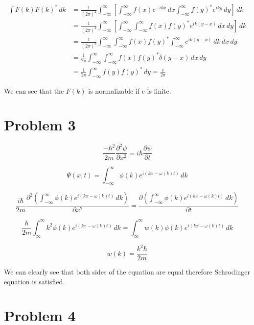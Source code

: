 \documentclass[12pt]{article}
\begin{document}
\begin{equation*}
    \begin{split}
        \int F(k) {F(k)}^*\, dk
         & = \frac{1}{(2 \pi)^2} \int_{-\infty}^{\infty} \left[\int_{-\infty}^{\infty} f(x) e^{-ikx}\, dx \int_{-\infty}^{\infty} {f(y)}^* e^{iky}\, dy \right]\, dk \\
         & = \frac{1}{(2 \pi)^2} \int_{-\infty}^{\infty} \left[\int_{-\infty}^{\infty}\int_{-\infty}^{\infty} f(x){f(y)}^* e^{ik(y-x)}\,dx\, dy \right]\, dk         \\
         & = \frac{1}{(2 \pi)^2} \int_{-\infty}^{\infty} \int_{-\infty}^{\infty} f(x){f(y)}^*\int_{-\infty}^{\infty} e^{ik(y-x)}\,dk\, dx \, dy                      \\
         & = \frac{1}{2\pi}\int_{-\infty}^{\infty} \int_{-\infty}^{\infty} f(x){f(y)}^*\delta(y-x) \, dx \, dy                                                       \\
         & = \frac{1}{2\pi}\int_{-\infty}^{\infty} f(y){f(y)}^* \, dy = \frac{c}{2\pi}
    \end{split}
\end{equation*}

We can see that the $F(k)$ is normalizable if c is finite.

\newpage
\section{Problem 3}

\[
    \frac{-\hbar^2}{2m}
    \frac{\partial^2 \psi}{\partial x^2} = i\hbar \frac{\partial \psi}{\partial t}
\]

\[
    \Psi(x, t) = \int_{-\infty}^{\infty} \phi(k) e^{i (k x - \omega(k) t)} \, dk
\]

\[
    \frac{i\hbar}{2m}
    \frac{\partial^2 (\int_{-\infty}^{\infty} \phi(k) e^{i (k x - \omega(k) t)} \, dk)}{\partial x^2} = \frac{\partial (\int_{-\infty}^{\infty} \phi(k) e^{i (k x - \omega(k) t)} \, dk)}{\partial t}
\]

\[
    \frac{\hbar}{2m}
    \int_{\infty}^{\infty} k^2 \phi(k) e^{i (k x - \omega(k) t)} \, dk = \int_{\infty}^{\infty} w(k)\phi(k) e^{i (k x - \omega(k) t)} \, dk
\]

\[
    w(k) = \frac{k^2\hbar}{2m}
\]

We can clearly see that both sides of the equation are equal therefore Schrodinger equation is satisfied.

\newpage
\section{Problem 4}
\end{document}

